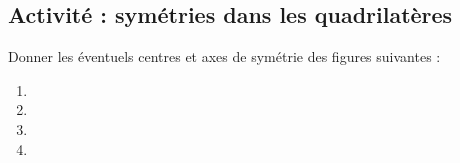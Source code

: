 
\subsection*{Activité : symétries dans les quadrilatères}

Donner les éventuels centres et axes de symétrie des figures suivantes :
\begin{multicols}{2}
\begin{enumerate}
    \item

    \item

    \item

    \item

\end{enumerate}
\end{multicols}


